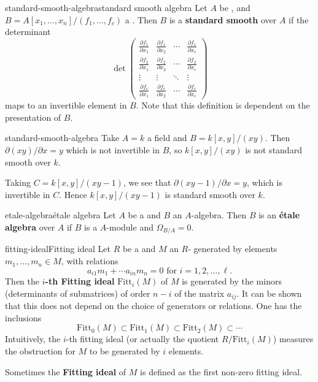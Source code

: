 \begin{topic}{standard-smooth-algebra}{standard smooth algebra}
    Let $A$ be , and $B = A[x_1, \ldots, x_n] / (f_1, \ldots, f_c)$ a . Then $B$ is a \textbf{standard smooth} over $A$ if the determinant
    \[ \det \begin{pmatrix}
        \frac{\partial f_1}{\partial x_1} & \frac{\partial f_1}{\partial x_2} & \cdots & \frac{\partial f_1}{\partial x_c} \\
        \frac{\partial f_2}{\partial x_1} & \frac{\partial f_2}{\partial x_2} & \cdots & \frac{\partial f_2}{\partial x_c} \\ 
        \vdots & \vdots & \ddots & \vdots \\ 
        \frac{\partial f_c}{\partial x_1} & \frac{\partial f_c}{\partial x_2} & \cdots & \frac{\partial f_c}{\partial x_c}
    \end{pmatrix} \]
    maps to an invertible element in $B$. Note that this definition is dependent on the presentation of $B$.
\end{topic}

\begin{example}{standard-smooth-algebra}
    Take $A = k$ a field and $B = k[x, y] / (xy)$. Then $\partial (xy) / \partial x = y$ which is not invertible in $B$, so $k[x, y] / (xy)$ is not standard smooth over $k$.
    
    Taking $C = k[x, y] / (xy - 1)$, we see that $\partial (xy - 1) / \partial x = y$, which is invertible in $C$. Hence $k[x, y] / (xy - 1)$ is standard smooth over $k$.
\end{example}

\begin{topic}{etale-algebra}{étale algebra}
    Let $A$ be a  and $B$ an $A$-algebra. Then $B$ is an \textbf{étale algebra} over $A$ if $B$ is a  $A$-module and $\Omega_{B/A} = 0$.
\end{topic}

\begin{topic}{fitting-ideal}{Fitting ideal}
    Let $R$ be a  and $M$ an $R$- generated by elements $m_1, \ldots, m_n \in M$, with relations
    \[ a_{i1} m_1 + \cdots a_{in} m_n = 0 \text{ for } i = 1, 2, \ldots, \ell . \]
    Then the \textbf{$i$-th Fitting ideal} $\text{Fitt}_i(M)$ of $M$ is generated by the minors (determinants of submatrices) of order $n - i$ of the matrix $a_{ij}$. It can be shown that this does not depend on the choice of generators or relations. One has the inclusions
    \[ \text{Fitt}_0(M) \subset \text{Fitt}_1(M) \subset \text{Fitt}_2(M) \subset \cdots \]
    Intuitively, the $i$-th fitting ideal (or actually the quotient $R / \text{Fitt}_i(M)$) measures the obstruction for $M$ to be generated by $i$ elements.
    
    Sometimes the \textbf{Fitting ideal} of $M$ is defined as the first non-zero fitting ideal.
\end{topic}

